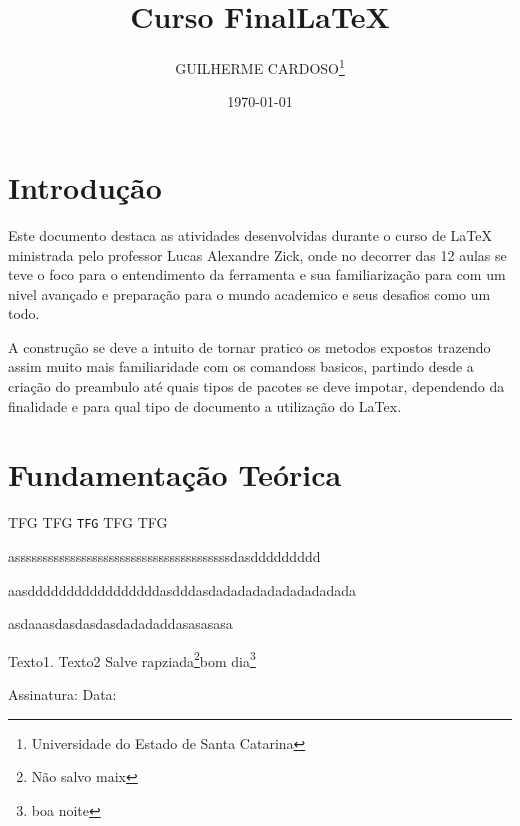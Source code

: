 \documentclass[12pt, a4paper]{article}
\title{Curso Final\LaTeX}
\author{GUILHERME CARDOSO\thanks{Universidade do Estado de Santa Catarina} }
\date{\today}
\begin{document}
\maketitle
\begin{abstract}
    
\end{abstract}
\newpage
\section{Introdução}
Este documento destaca as atividades desenvolvidas durante o curso de LaTeX ministrada pelo professor Lucas Alexandre Zick, onde no decorrer das 12 aulas se teve o foco para o entendimento da ferramenta e sua familiarização para com um nivel avançado e preparação para o mundo academico e seus desafios como um todo.

A construção se deve a intuito de tornar pratico os metodos expostos trazendo assim muito mais familiaridade com os comandoss basicos, partindo desde a criação do preambulo até quais tipos de pacotes se deve impotar, dependendo da finalidade e para qual tipo de documento a utilização do LaTex.

\section{Fundamentação Teórica}


\textsf{\huge TFG}
TFG
\texttt{TFG}
\textsc{\tiny TFG}
{\scriptsize TFG}

\begin{center}
    asssssssssssssssssssssssssssssssssssssssdasddddddddd
\end{center}

\begin{flushleft}
aasdddddddddddddddddasdddasdadadadadadadadadada
\end{flushleft}

\begin{flushright}
    asdaaasdasdasdasdadadaddasasasasa
\end{flushright}



Texto1.
\vspace{2cm}
Texto2
Salve rapziada\footnote{Não salvo maix}bom dia\footnote{boa noite}


Assinatura: \hspace{9cm} Data:
\end{document}

